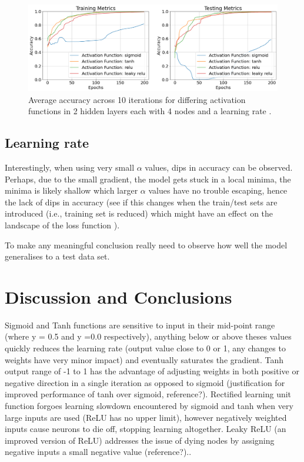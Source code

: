 \documentclass{article}
\begin{document}
\begin{figure}[H]
  \centering
  \includegraphics[width=\textwidth]{figs/funcs.png}
  \caption{
    Average accuracy across 10 iterations for differing activation
    functions in 2 hidden layers each with 4 nodes and a learning rate
     .
  }
  \label{fig:funcs}
\end{figure}

\subsection{Learning rate}

Interestingly, when using very small $\alpha$ values, dips in accuracy can be observed. Perhaps, due to the small gradient, the model gets stuck in a local minima, the minima is likely shallow which larger $\alpha$ values have no trouble escaping, hence the lack of dips in accuracy (see if this changes when the train/test sets are introduced (i.e., training set is reduced) which might have an effect on the landscape of the loss function \cite{Guo}).

To make any meaningful conclusion really need to observe how well the model generalises to a test data set.

\section{Discussion and Conclusions}
Sigmoid and Tanh functions are sensitive to input in their mid-point range (where y = 0.5 and y =0.0 respectively), anything below or above theses values quickly reduces the learning rate (output value close to 0 or 1, any changes to weights have very minor impact) and eventually saturates the gradient.
Tanh output range of -1 to 1 has the advantage of adjusting weights in both positive or negative direction in a single iteration as opposed to sigmoid (justification for improved performance of tanh over sigmoid, reference?).
Rectified learning unit function forgoes learning slowdown encountered by sigmoid and tanh when very large inputs are used (ReLU has no upper limit), however negatively weighted inputs cause neurons to die off, stopping learning altogether. Leaky ReLU (an improved version of ReLU) addresses the issue of dying nodes by assigning negative inputs a small negative value (reference?)..
\end{document}
